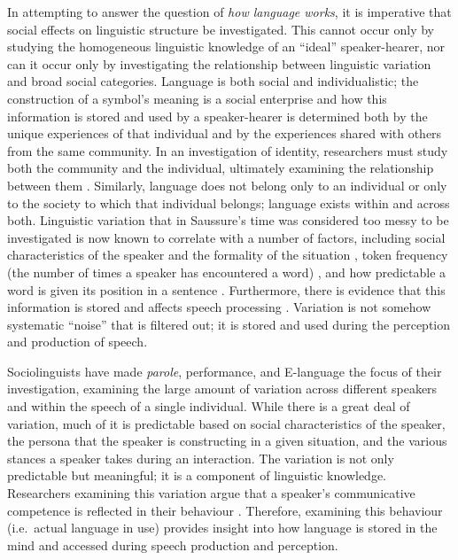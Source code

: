 In attempting to answer the question of \textit{how language works}, it is imperative that social effects on linguistic structure be investigated. This cannot occur only by studying the homogeneous linguistic knowledge of an ``ideal'' speaker-hearer, nor can it occur only by investigating the relationship between linguistic variation and broad social categories. Language is both social and individualistic; the construction of a symbol's meaning is a social enterprise and how this information is stored and used by a speaker-hearer is determined both by the unique experiences of that individual and by the experiences shared with others from the same community. In an investigation of identity, researchers must study both the community and the individual, ultimately examining the relationship between them \citep[146]{wenger1998}. Similarly, language does not belong only to an individual or only to the society to which that individual belongs; language exists within and across both. Linguistic variation that in Saussure's time was considered too messy to be investigated is now known to correlate with a number of factors, including social characteristics of the speaker and the formality of the situation \citep{labov1972sociolingpatterns}, token frequency (the number of times a speaker has encountered a word) \citep{bybee2002}, and how predictable a word is given its position in a sentence \citep{jurafskyetal2002}. Furthermore, there is evidence that this information is stored and affects speech processing \citep{strand1999,jurafsky2003}. Variation is not somehow systematic ``noise'' that is filtered out; it is stored and used during the perception and production of speech.

Sociolinguists have made \textit{parole}, performance, and E-language the focus of their investigation, examining the large amount of variation across different speakers and within the speech of a single individual. While there is a great deal of variation, much of it is predictable based on social characteristics of the speaker, the persona that the speaker is constructing in a given situation, and the various stances a speaker takes during an interaction. The variation is not only predictable but meaningful; it is a component of linguistic knowledge. Researchers examining this variation argue that a speaker's communicative competence is reflected in their behaviour \citep{hymes1972}. Therefore, examining this behaviour (i.e.~actual language in use) provides insight into how language is stored in the mind and accessed during speech production and perception. 

